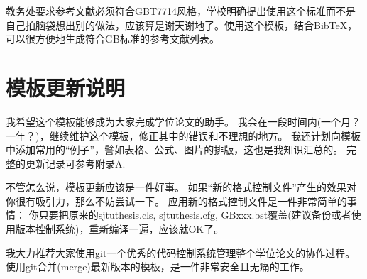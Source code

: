 教务处要求参考文献必须符合GBT7714风格，学校明确提出使用这个标准而不是自己拍脑袋想出别的做法，应该算是谢天谢地了。使用这个模板，结合BibTeX，可以很方便地生成符合GB标准的参考文献列表。

\section{模板更新说明}
\label{sec:update}

我希望这个模板能够成为大家完成学位论文的助手。
我会在一段时间内(一个月？一年？)，继续维护这个模板，修正其中的错误和不理想的地方。
我还计划向模板中添加常用的``例子''，譬如表格、公式、图片的排版，这也是我知识汇总的。
完整的更新记录可参考附录A.

不管怎么说，模板更新应该是一件好事。
如果``新的格式控制文件''产生的效果对你很有吸引力，那么不妨尝试一下。
应用新的格式控制文件是一件非常简单的事情：
你只要把原来的sjtuthesis.cls, sjtuthesis.cfg, GBxxx.bst覆盖(建议备份或者使用版本控制系统)，重新编译一遍，应该就OK了。

我大力推荐大家使用\href{http://git-scm.com}{git}\cndash{}一个优秀的代码控制系统\cndash{}管理整个学位论文的协作过程。使用git合并(merge)最新版本的模板，是一件非常安全且无痛的工作。


